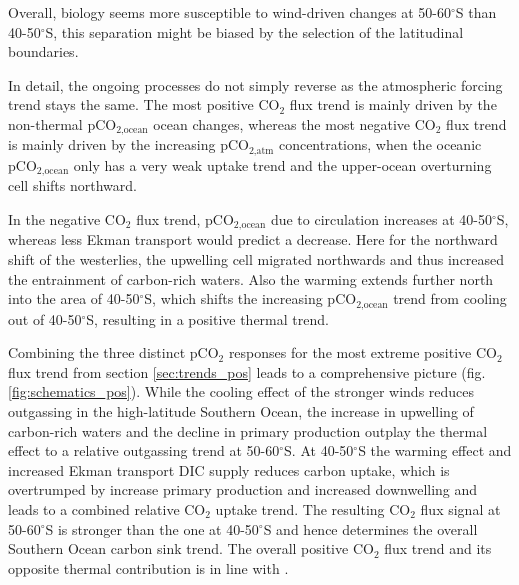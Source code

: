 Overall, biology seems more susceptible to wind-driven changes at 50-60$^\circ$S than 40-50$^\circ$S, this separation might be biased by the selection of the latitudinal boundaries.\newline

In detail, the ongoing processes do not simply reverse as the atmospheric forcing trend stays the same. 
The most positive CO$_2$ flux trend is mainly driven by the non-thermal pCO$_{\text{2,ocean}}$ ocean changes, whereas the most negative CO$_2$ flux trend is mainly driven by the increasing pCO$_{\text{2,atm}}$ concentrations, when the oceanic pCO$_{\text{2,ocean}}$ only has a very weak uptake trend and the upper-ocean overturning cell shifts northward.

In the negative CO$_2$ flux trend, pCO$_{\text{2,ocean}}$ due to circulation increases at 40-50$^\circ$S, whereas less Ekman transport would predict a decrease. Here for the northward shift of the westerlies, the upwelling cell migrated northwards and thus increased the entrainment of carbon-rich waters. Also the warming extends further north into the area of 40-50$^\circ$S, which shifts the increasing pCO$_{\text{2,ocean}}$ trend from cooling out of 40-50$^\circ$S, resulting in a positive thermal trend.






\label{sec:pCO2separation_pos}

Combining the three distinct pCO$_2$ responses for the most extreme positive CO$_2$ flux trend from section \ref{sec:trends_pos} leads to a comprehensive picture (fig. \ref{fig:schematics_pos}). 
While the cooling effect of the stronger winds reduces outgassing in the high-latitude Southern Ocean, the increase in upwelling of carbon-rich waters and the decline in primary production outplay the thermal effect to a relative outgassing trend at 50-60$^\circ$S. At 40-50$^\circ$S the warming effect and  increased Ekman transport DIC supply reduces carbon uptake, which is overtrumped by increase primary production and increased downwelling and leads to a combined relative CO$_2$ uptake trend. The resulting CO$_2$ flux signal at 50-60$^\circ$S is stronger than the one at 40-50$^\circ$S and hence determines the overall Southern Ocean carbon sink trend. The overall positive CO$_2$ flux trend and its opposite thermal contribution is in line with \cite{Lovenduski2007}.\newline


